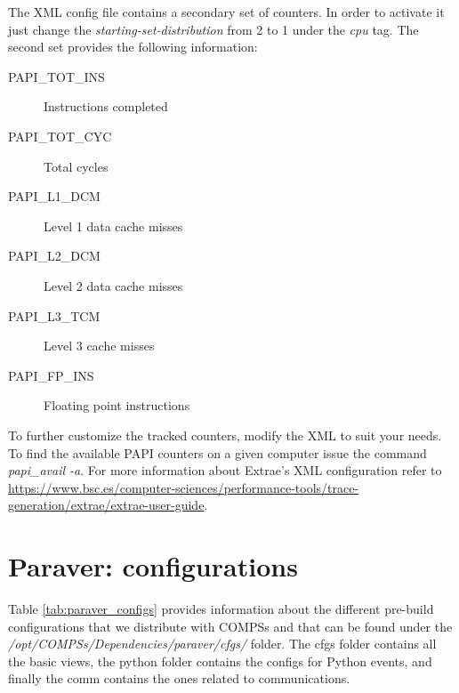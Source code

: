 The XML config file contains a secondary set of counters. In order to activate it just change the \textit{starting-set-distribution} from 2 to 1 under the \textit{cpu} tag. The second set provides the following information:

\begin{description}
 \item [PAPI\_TOT\_INS] Instructions completed
 \item [PAPI\_TOT\_CYC] Total cycles
 \item [PAPI\_L1\_DCM] Level 1 data cache misses
 \item [PAPI\_L2\_DCM] Level 2 data cache misses
 \item [PAPI\_L3\_TCM] Level 3 cache misses
 \item [PAPI\_FP\_INS] Floating point instructions
\end{description}


To further customize the tracked counters, modify the XML to suit your needs. To find the available PAPI counters on a given computer issue the command \textit{papi\_avail -a}. For more information about Extrae's XML configuration refer to \url{https://www.bsc.es/computer-sciences/performance-tools/trace-generation/extrae/extrae-user-guide}.



\section{Paraver: configurations}
\label{sec:configs}

Table \ref{tab:paraver_configs} provides information about the different pre-build configurations that we distribute
with COMPSs and that can be found under the \textit{/opt/COMPSs/Dependencies/paraver/cfgs/} folder. The cfgs folder contains all the basic views, the python folder contains the configs for Python events, and finally the comm contains the ones related to communications.


